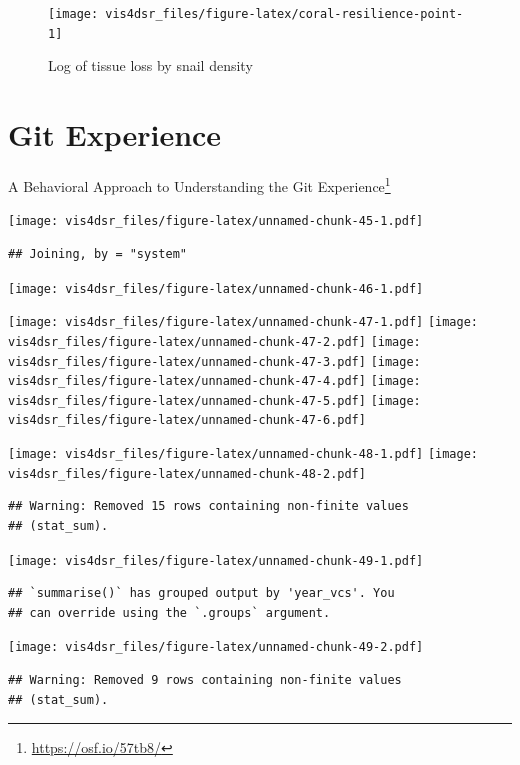 \documentclass[
]{krantz}
\renewcommand{\href}[2]{#2\footnote{\url{#1}}}
\begin{document}
\begin{figure}
\texttt{[image: vis4dsr\_files/figure-latex/coral-resilience-point-1]} \caption{Log of tissue loss by snail density}\label{fig:coral-resilience-point}
\end{figure}

\hypertarget{git-experience}{%
\section*{Git Experience}\label{git-experience}}


\href{https://osf.io/57tb8/}{A Behavioral Approach to Understanding the Git Experience}

\texttt{[image: vis4dsr\_files/figure-latex/unnamed-chunk-45-1.pdf]}

\begin{verbatim}
## Joining, by = "system"
\end{verbatim}

\texttt{[image: vis4dsr\_files/figure-latex/unnamed-chunk-46-1.pdf]}

\texttt{[image: vis4dsr\_files/figure-latex/unnamed-chunk-47-1.pdf]} \texttt{[image: vis4dsr\_files/figure-latex/unnamed-chunk-47-2.pdf]} \texttt{[image: vis4dsr\_files/figure-latex/unnamed-chunk-47-3.pdf]} \texttt{[image: vis4dsr\_files/figure-latex/unnamed-chunk-47-4.pdf]} \texttt{[image: vis4dsr\_files/figure-latex/unnamed-chunk-47-5.pdf]} \texttt{[image: vis4dsr\_files/figure-latex/unnamed-chunk-47-6.pdf]}

\texttt{[image: vis4dsr\_files/figure-latex/unnamed-chunk-48-1.pdf]} \texttt{[image: vis4dsr\_files/figure-latex/unnamed-chunk-48-2.pdf]}

\begin{verbatim}
## Warning: Removed 15 rows containing non-finite values
## (stat_sum).
\end{verbatim}

\texttt{[image: vis4dsr\_files/figure-latex/unnamed-chunk-49-1.pdf]}

\begin{verbatim}
## `summarise()` has grouped output by 'year_vcs'. You
## can override using the `.groups` argument.
\end{verbatim}

\texttt{[image: vis4dsr\_files/figure-latex/unnamed-chunk-49-2.pdf]}

\begin{verbatim}
## Warning: Removed 9 rows containing non-finite values
## (stat_sum).
\end{verbatim}
\end{document}
